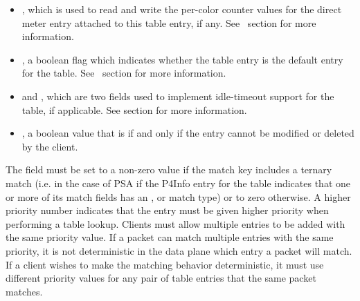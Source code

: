 \documentclass[11pt]{article}
\begin{document}
{\begin{itemize}
\item{}
, which is used to read and write the per-color counter
values for the direct meter entry attached to this table entry, if any.
See~ section for more information.%

\item{}
, a boolean flag which indicates whether the table entry is
the default entry for the table. See~
section for more information.%

\item{}
 and , which are two fields used to
implement idle-timeout support for the table, if applicable. See
 section for more information.%

\item{}
, a boolean value that is  if and only if the entry
cannot be modified or deleted by the client.%
\end{itemize}%

\noindent{}The  field must be set to a non-zero value if the match key includes a
ternary match (i.e. in the case of PSA if the P4Info entry for the table
indicates that one or more of its match fields has an ,  or
 match
type) or to zero otherwise. A higher priority number indicates that the entry
must be given higher priority when performing a table lookup. Clients must allow
multiple entries to be added with the same priority value.  If a packet can
match multiple entries with the same priority, it is not deterministic in the
data plane which entry a packet will match.  If a client wishes to make the
matching behavior deterministic, it must use different priority values for any
pair of table entries that the same packet matches.%

}
\end{document}
